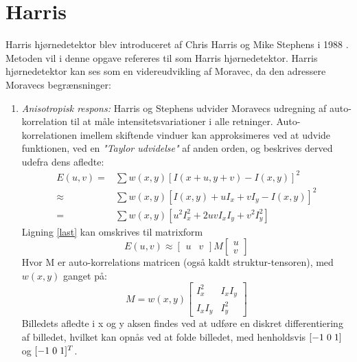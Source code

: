 \section{Harris}\label{sec:harris}
Harris hjørnedetektor blev introduceret af Chris Harris og Mike Stephens i 1988 \cite{harris}. Metoden vil i denne opgave refereres til som Harris hjørnedetektor. Harris hjørnedetektor kan ses som en videreudvikling af Moravec, da den adressere Moravecs begrænsninger:
\begin{enumerate}
\item{ \textit{Anisotropisk respons:} Harris og Stephens udvider Moravecs udregning af auto-korrelation til at måle intensitetsvariationer i alle retninger. Auto-korrelationen imellem skiftende vinduer kan approksimeres ved at udvide funktionen, ved en \textit{"Taylor udvidelse"} af anden orden, og beskrives derved udefra dens afledte:
\begin{subequations}
\begin{align}
E(u,v) = & \sum w(x,y)[I(x + u, y + v) - I(x,y)]^2 \\
\approx & \sum w(x,y)[I(x,y) + uI_x  + vI_y - I(x,y)]^2 \\
= & \sum w(x,y)[u^2I_x^2 + 2uvI_xI_y + v^2I_y^2]  \label{last}
\end{align}
\end{subequations}
Ligning \eqref{last} kan omskrives til matrixform
\begin{equation}
E(u,v) \approx
\begin{bmatrix}
        u & v
     \end{bmatrix}
M
\begin{bmatrix}
        u \\
        v
     \end{bmatrix}
\end{equation} 
Hvor M er auto-korrelations matricen (også kaldt struktur-tensoren), med $w(x,y)$ ganget på:
\begin{equation}
M = w(x,y) 
\begin{bmatrix}
	I_x^2 & I_xI_y \\
	I_xI_y & I_y^2
\end{bmatrix}
\label{structens}
\end{equation}
Billedets afledte i x og y aksen findes ved at udføre en diskret differentiering af billedet, hvilket kan opnås
 ved at folde billedet, med henholdsvis $[-1 \hspace{0.1cm} 0 \hspace{0.1cm} 1]$ og $[-1 \hspace{0.1cm} 0 \hspace{0.1cm} 1]^T$. }

\end{enumerate}
